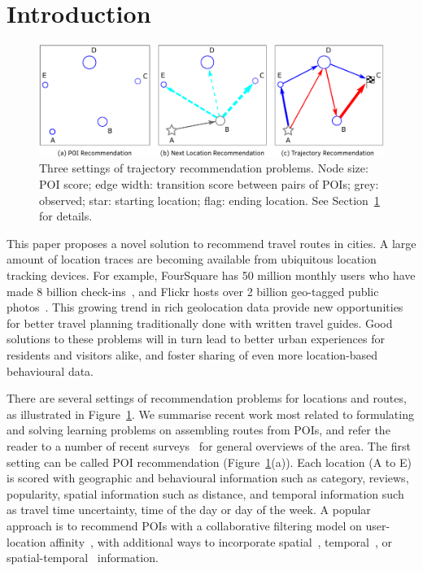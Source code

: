\section{Introduction}
\label{sec:intro}

\begin{figure}[t]
	\centering
	\includegraphics[width=\columnwidth]{fig/fig1-flavours.pdf}
	\caption{Three settings of trajectory recommendation problems.
Node size: POI score; edge width: transition score between pairs of POIs;
grey: observed;
star: starting location; flag: ending location. See Section~\ref{sec:intro} for details.
}
	\label{fig:threesettings}\captionmoveup
\end{figure}


This paper proposes a novel solution to recommend travel routes in cities.
A large amount of location traces are becoming available from ubiquitous location tracking devices.
For example, FourSquare has 50 million monthly users who have made 8 billion check-ins~\cite{4sq},
and Flickr hosts over 2 billion geo-tagged public photos~\cite{flickr}.
This growing trend in rich geolocation data
provide new opportunities for better
travel planning traditionally done with written travel guides.
Good solutions to these problems will in turn lead to better urban experiences for residents and visitors alike, and foster sharing of even more location-based behavioural data.


There are several settings of recommendation problems for locations and routes, as illustrated in Figure~\ref{fig:threesettings}.
We summarise recent work most related to formulating and solving learning problems on assembling routes from POIs,
and refer the reader to a number of recent surveys~\cite{bao2015recommendations,zheng2015trajectory,zheng2014urban} for general overviews of the area.
The first setting can be called POI recommendation (Figure~\ref{fig:threesettings}(a)). Each location (A to E) is scored with geographic and behavioural information such as category, reviews, popularity, spatial information such as distance, and temporal information such as travel time uncertainty, time of the day or day of the week.
A popular approach is to recommend POIs with a collaborative filtering model
on user-location affinity~\cite{shi2011personalized}, with additional ways to incorporate spatial~\cite{lian2014geomf,liu2014exploiting}, temporal~\cite{yuan2013timeaware,hsieh2014mining,gao2013temporal}, or spatial-temporal~\cite{yuan2014graph} information.

